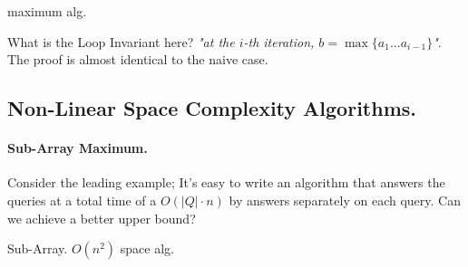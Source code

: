 \begin{example}
\begin{algorithm}[H]
{}
 \caption{maximum alg.}
\end{algorithm}

What is the Loop Invariant here? \textit{"at the \(i\)-th iteration, \(b = \max{ \{ a_1 ... a_{i-1} \} } \)"}. The proof is almost identical to the naive case.   
\end{example}
\subsection{Non-Linear Space Complexity Algorithms. }
\paragraph{Sub-Array Maximum.} Consider the leading example; It's easy to write an algorithm that answers the queries at a total time of a \( O\left( |Q| \cdot n \right) \) by answers separately on each query. Can we achieve a better upper bound?



%
%
\begin{algorithm}
  \caption{Sub-Array. \(O(n^2)\) space alg.}
{}
\end{algorithm}
%

